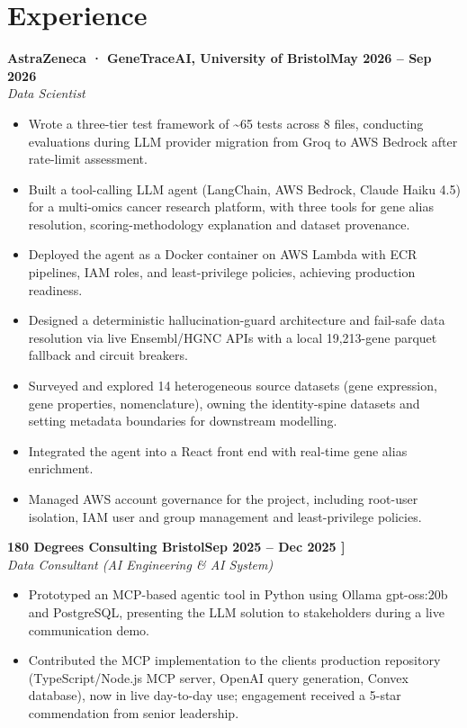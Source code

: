 \documentclass[a4paper,11pt]{article}
\newcommand{\entry}[4]{\needspace{4\baselineskip}\noindent\textbf{#1}\hfill\textbf{#2}\\ \textit{#3}\hfill\textit{#4}\par}
\begin{document}
\section{Experience}
\entry{AstraZeneca · GeneTraceAI, University of Bristol}{May 2026 – Sep 2026}{Data Scientist}{}
\begin{itemize}
  \item Wrote a three-tier test framework of \textasciitilde{}65 tests across 8 files, conducting evaluations during LLM provider migration from Groq to AWS Bedrock after rate-limit assessment.
  \item Built a tool-calling LLM agent (LangChain, AWS Bedrock, Claude Haiku 4.5) for a multi-omics cancer research platform, with three tools for gene alias resolution, scoring-methodology explanation and dataset provenance.
  \item Deployed the agent as a Docker container on AWS Lambda with ECR pipelines, IAM roles, and least-privilege policies, achieving production readiness.
  \item Designed a deterministic hallucination-guard architecture and fail-safe data resolution via live Ensembl/HGNC APIs with a local 19,213-gene parquet fallback and circuit breakers.
  \item Surveyed and explored 14 heterogeneous source datasets (gene expression, gene properties, nomenclature), owning the identity-spine datasets and setting metadata boundaries for downstream modelling.
  \item Integrated the agent into a React front end with real-time gene alias enrichment.
  \item Managed AWS account governance for the project, including root-user isolation, IAM user and group management and least-privilege policies.
\end{itemize}
\vspace{4pt}
\entry{180 Degrees Consulting Bristol}{Sep 2025 – Dec 2025   ]}{Data Consultant (AI Engineering \& AI System)}{}
\begin{itemize}
  \item Prototyped an MCP-based agentic tool in Python using Ollama gpt-oss:20b and PostgreSQL, presenting the LLM solution to stakeholders during a live communication demo.
  \item Contributed the MCP implementation to the client\textquotesingle{}s production repository (TypeScript/Node.js MCP server, OpenAI query generation, Convex database), now in live day-to-day use; engagement received a 5-star commendation from senior leadership.
\end{itemize}
\end{document}
